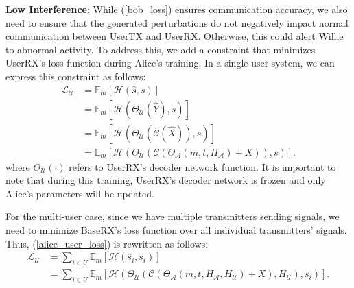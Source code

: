 
\textbf{Low Interference}: While (\ref{bob_loss}) ensures communication accuracy, we also need to ensure that the generated perturbations do not negatively impact normal communication between UserTX and UserRX. Otherwise, this could alert Willie to abnormal activity. To address this, we add a constraint that minimizes UserRX's loss function during Alice's training. In a single-user system, we can express this constraint as follows:
\begin{equation}
	\begin{aligned} \label{alice_user_loss}
		\mathcal{L}_{\mathcal{U}} & = \mathbb{E}_{m}[\mathcal{H}(\hat{s}, s)] \\
		& = \mathbb{E}_{m}[\mathcal{H}(\Theta_{\mathcal{U}}(\hat{Y}), s)] \\
		& = \mathbb{E}_{m}[\mathcal{H}(\Theta_{\mathcal{U}}(\mathcal{C}(\hat{X})), s)] \\
		& = \mathbb{E}_{m}[\mathcal{H}(\Theta_{\mathcal{U}}(\mathcal{C}(\Theta_{\mathcal{A}}(m, t, H_{\mathcal{A}}) + X)), s)].
	\end{aligned}
\end{equation}
where \(\Theta_{\mathcal{U}}(\cdot)\) refers to UserRX's decoder network function. It is important to note that during this training, UserRX's decoder network is frozen and only Alice's parameters will be updated.

For the multi-user case, since we have multiple transmitters sending signals, we need to minimize BaseRX's loss function over all individual transmitters' signals. Thus, (\ref{alice_user_loss}) is rewritten as follows:
\begin{equation}
	\begin{aligned} \label{multi_alice_user_loss}
		\mathcal{L}_{\mathcal{U}} & = \sum_{i \in U}\mathbb{E}_{m}[\mathcal{H}(\hat{s}_i, s_i)] \\
		& = \sum_{i \in U}  
		\mathbb{E}_{m}[\mathcal{H}
		(\Theta_{\mathcal{U}}(\mathcal{C}(\Theta_{\mathcal{A}}(m, t, H_{\mathcal{A}}, H_{\mathcal{U}}) + X),  H_{\mathcal{U}}), s_i)].
	\end{aligned}
\end{equation}

